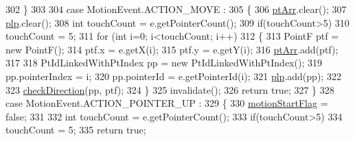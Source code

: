 \begin{DoxyCode}
302                     \}
303                     
304                     \textcolor{keywordflow}{case} MotionEvent.ACTION\_MOVE :
305                     \{
306                         \hyperlink{classcom_1_1example_1_1multitouchsample_1_1_main_activity_1_1_my_view_ab2213518b7234955478ef54ebdd1db22}{ptArr}.clear();
307                         \hyperlink{classcom_1_1example_1_1multitouchsample_1_1_main_activity_1_1_my_view_a594a2fb9e001c0cfa1aa538c903bc3f8}{plp}.clear();
308                         \textcolor{keywordtype}{int} touchCount = e.getPointerCount();
309                         \textcolor{keywordflow}{if}(touchCount>5)
310                             touchCount = 5;
311                         \textcolor{keywordflow}{for} (\textcolor{keywordtype}{int} i=0; i<touchCount; i++)
312                         \{
313                             PointF ptf = \textcolor{keyword}{new} PointF();
314                             ptf.x = e.getX(i);
315                             ptf.y = e.getY(i);
316                             \hyperlink{classcom_1_1example_1_1multitouchsample_1_1_main_activity_1_1_my_view_ab2213518b7234955478ef54ebdd1db22}{ptArr}.add(ptf);
317                             
318                             PtIdLinkedWithPtIndex pp = \textcolor{keyword}{new} PtIdLinkedWithPtIndex();
319                             pp.pointerIndex = i;
320                             pp.pointerId = e.getPointerId(i);
321                             \hyperlink{classcom_1_1example_1_1multitouchsample_1_1_main_activity_1_1_my_view_a594a2fb9e001c0cfa1aa538c903bc3f8}{plp}.add(pp);
322                             
323                             \hyperlink{classcom_1_1example_1_1multitouchsample_1_1_main_activity_1_1_my_view_a6fbf678025aa07a8024eddeb5431b30c}{checkDirection}(pp, ptf);
324                         \}
325                         invalidate();
326                         \textcolor{keywordflow}{return} \textcolor{keyword}{true};
327                     \}
328                     \textcolor{keywordflow}{case} MotionEvent.ACTION\_POINTER\_UP :
329                     \{
330                         \hyperlink{classcom_1_1example_1_1multitouchsample_1_1_main_activity_1_1_my_view_ab1da26ed65817fe5db4d0be4892ac4b2}{motionStartFlag} = \textcolor{keyword}{false};
331                         
332                         \textcolor{keywordtype}{int} touchCount = e.getPointerCount();
333                         \textcolor{keywordflow}{if}(touchCount>5)
334                             touchCount = 5;
335                         \textcolor{keywordflow}{return} \textcolor{keyword}{true};

\end{DoxyCode}

